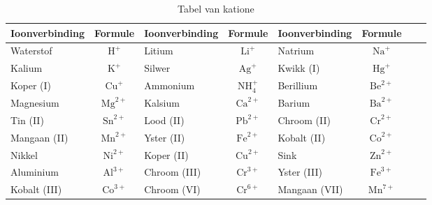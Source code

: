\begin{enumerate}[noitemsep, label=\textbf{\arabic*}. ]
\begin{table}[H]
\begin{center}
\label{tab:cations}
\begin{tabular}{|l|c|l|c|l|c|l|c|} \hline
\textbf{Ioonverbinding} & \textbf{Formule} & \textbf{Ioonverbinding} & \textbf{Formule} & \textbf{Ioonverbinding} & \textbf{Formule}  \\ \hline
Waterstof       & $\text{H}^{+}$   & Litium          & $\text{Li}^{+}$     & Natrium          & $\text{Na}^{+}$  \\ \hline
Kalium          & $\text{K}^{+}$   & Silwer          & $\text{Ag}^{+}$     & Kwikk (I)        & $\text{Hg}^{+}$  \\ \hline
Koper (I)       & $\text{Cu}^{+}$  & Ammonium        & $\text{NH}_{4}^{+}$ & Berillium        & $\text{Be}^{2+}$ \\ \hline
Magnesium       & $\text{Mg}^{2+}$ & Kalsium         & $\text{Ca}^{2+}$    & Barium           & $\text{Ba}^{2+}$ \\ \hline
Tin (II)        & $\text{Sn}^{2+}$ & Lood (II)       & $\text{Pb}^{2+}$    & Chroom (II)      & $\text{Cr}^{2+}$ \\ \hline
Mangaan (II)    & $\text{Mn}^{2+}$ & Yster (II)      & $\text{Fe}^{2+}$    & Kobalt (II)      & $\text{Co}^{2+}$ \\ \hline
Nikkel          & $\text{Ni}^{2+}$ & Koper (II)      & $\text{Cu}^{2+}$    & Sink             & $\text{Zn}^{2+}$ \\ \hline
Aluminium       & $\text{Al}^{3+}$ & Chroom (III)    & $\text{Cr}^{3+}$    & Yster (III)      & $\text{Fe}^{3+}$ \\ \hline
Kobalt (III)    & $\text{Co}^{3+}$ & Chroom (VI)     & $\text{Cr}^{6+}$    & Mangaan (VII)    & $\text{Mn}^{7+}$ \\ \hline

\end{tabular}

 \end{center}
\caption{Tabel van katione}
\label{tab:cations}
\end{table}


\end{enumerate}
